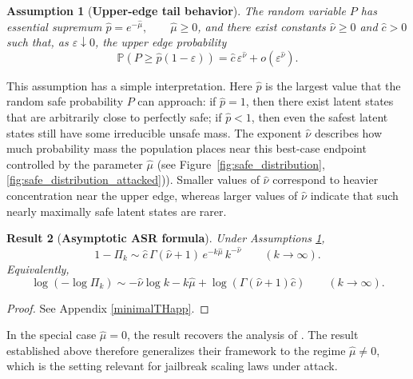 \documentclass{article}
\newtheorem{theorem}{Result}
\newtheorem{assumption}[theorem]{Assumption}
\theoremstyle{remark} %
\begin{document}
\begin{assumption}[\textbf{Upper-edge tail behavior}]\label{assumption}
The random variable $P$ has essential supremum $ \hat p = e^{-\hat\mu}, \qquad \hat\mu \ge 0$, and there exist constants $\hat\nu \ge 0$ and $\hat c>0$ such that, as $\varepsilon \downarrow 0$, the upper edge probability 
\begin{equation}
\mathbb{P} \left(P \ge \hat p(1-\varepsilon)\right)
=
\hat c\,\varepsilon^{\hat\nu}
+
o \left(\varepsilon^{\hat\nu}\right).
\end{equation}
\end{assumption}
This assumption has a simple interpretation. 
Here $\hat{p}$ is the largest value that the random safe probability $P$ can approach: if $\hat{p}=1$, then there exist latent states that are arbitrarily close to perfectly safe; if $\hat{p}<1$, then even the safest latent states still have some irreducible unsafe mass. The exponent $\hat{\nu}$ describes how much probability mass the population places near this best-case
endpoint controlled by the parameter $\hat \mu$ (see Figure~\ref{fig:safe_distribution}, \ref{fig:safe_distribution_attacked})).  Smaller values of \(\hat\nu\) correspond to heavier concentration near the upper edge, whereas larger values of \(\hat\nu\) indicate that such nearly maximally safe latent states are rarer. 










\begin{theorem}[\textbf{Asymptotic ASR formula}]\label{minimalTH}
Under Assumptions \ref{assumption},
\begin{equation}
1-\Pi_k\sim \hat{c}\,\Gamma(\hat{\nu}+1)\,e^{-k \hat \mu}\,k^{-\hat{\nu}}
\qquad (k\to\infty). \tag{5}
\end{equation}
Equivalently, 
\begin{equation}
    \log(-\log \Pi_k)\sim-\hat{\nu}\log k-k\hat \mu+ \log (\Gamma(\hat{\nu}+1) \hat{c})
\qquad (k\to\infty). \tag{6}
\end{equation}
\end{theorem}

\begin{proof}
    See Appendix \ref{minimalTHapp}.
\end{proof}

In the special case $\hat{\mu}=0$, the result recovers the analysis of \citet{schaeffer2025large}. The result established above therefore generalizes their framework to the regime $\hat{\mu}\neq 0$, which is the setting relevant for jailbreak scaling laws under attack.
\end{document}
